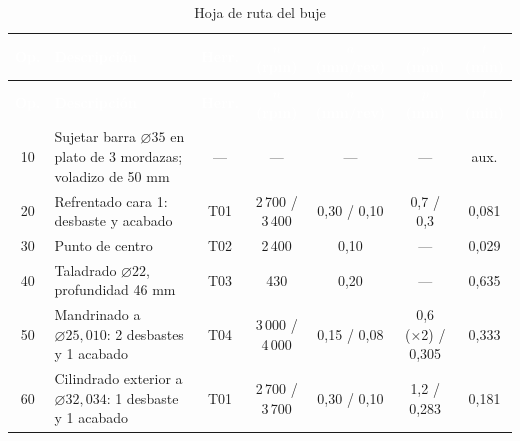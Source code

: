 \documentclass[12pt,a4paper]{article}
\newcommand{\encab}[1]{\textcolor{white}{\sffamily\bfseries #1}}
\begin{document}
	{\small
		\setlength{\tabcolsep}{3pt}
		\begin{longtable}{c >{\raggedright\arraybackslash}p{3.8cm} c c c c c}
			\caption{Hoja de ruta del buje}\label{tab:ruta}
			\\
			\rowcolor{darkblue}
			\encab{Op.}                                        & \encab{Descripción}
			                                                   & \encab{Herr.}                                                           & \encab{$n$ (rpm)} &
			\encab{$a$ (mm/rev)}                               & \encab{$p$ (mm)}
			                                                   & \encab{$t$ (min)}
			\\
			\endfirsthead
			\rowcolor{darkblue}
			\encab{Op.}                                        & \encab{Descripción}                                                     & \encab{Herr.}     & \encab{$n$ (rpm)} &
			\encab{$a$ (mm/rev)}                               & \encab{$p$ (mm)}
			                                                   & \encab{$t$ (min)}
			\\
			\endhead
			10                                                 & Sujetar barra $\varnothing35$ en plato de 3 mordazas; voladizo de 50 mm & ---               & ---               & ---         & ---              & aux.  \\
			20                                                 & Refrentado cara 1: desbaste y acabado                                   & T01               & 2\,700 / 3\,400   & 0,30 / 0,10 & 0,7 / 0,3        & 0,081 \\
			30                                                 & Punto de centro                                                         & T02               & 2\,400            & 0,10        & ---              & 0,029 \\
			40                                                 & Taladrado $\varnothing22$, profundidad 46 mm                            & T03               & 430               & 0,20        & ---              & 0,635 \\
			50                                                 & Mandrinado a $\varnothing25{,}010$: 2 desbastes y 1 acabado             & T04               & 3\,000 / 4\,000   & 0,15 / 0,08 & 0,6 (×2) / 0,305 & 0,333 \\
			60                                                 & Cilindrado exterior a $\varnothing32{,}034$: 1 desbaste y 1 acabado     & T01               & 2\,700 / 3\,700   & 0,30 / 0,10 & 1,2 / 0,283      & 0,181 \\

\end{longtable}}
\end{document}

